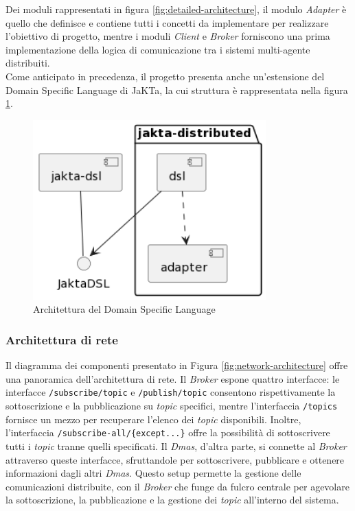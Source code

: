 Dei moduli rappresentati in figura \ref{fig:detailed-architecture}, il modulo \textit{Adapter} è quello che definisce e contiene tutti i concetti da implementare per realizzare l'obiettivo di progetto,
mentre i moduli \textit{Client} e \textit{Broker} forniscono una prima implementazione della logica di comunicazione tra i sistemi multi-agente distribuiti.\\

Come anticipato in precedenza, il progetto presenta anche un'estensione del Domain Specific Language di JaKTa, la cui struttura è rappresentata nella figura \ref{fig:dsl-architecture}.

\begin{figure}[ht!]
    \centering
    \includegraphics[width=0.8\textwidth]{figures/dsl-architecture.png}
    \caption{Architettura del Domain Specific Language}
    \label{fig:dsl-architecture}
\end{figure}

\subsubsection{Architettura di rete}

Il diagramma dei componenti presentato in Figura \ref{fig:network-architecture} offre una panoramica dell'architettura di rete.
Il \textit{Broker} espone quattro interfacce: le interfacce \texttt{/subscribe/{topic}} e \texttt{/publish/{topic}} consentono rispettivamente la sottoscrizione e la pubblicazione su \textit{topic} specifici, mentre l'interfaccia \texttt{/topics} fornisce un mezzo per recuperare l'elenco dei \textit{topic} disponibili. Inoltre, l'interfaccia \texttt{/subscribe-all/\{except...\}} offre la possibilità di sottoscrivere tutti i \textit{topic} tranne quelli specificati. Il \textit{Dmas}, d'altra parte, si connette al \textit{Broker} attraverso queste interfacce, sfruttandole per sottoscrivere, pubblicare e ottenere informazioni dagli altri \textit{Dmas}. Questo setup permette la gestione delle comunicazioni distribuite, con il \textit{Broker} che funge da fulcro centrale per agevolare la sottoscrizione, la pubblicazione e la gestione dei \textit{topic} all'interno del sistema.

